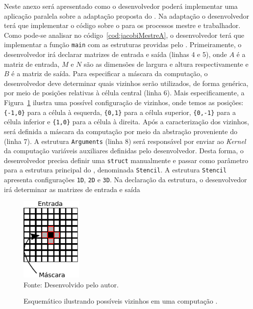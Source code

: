 Neste anexo será apresentado como o desenvolvedor poderá implementar uma
aplicação paralela sobre a adaptação proposta do \fw \pskel. Na adaptação o desenvolvedor
terá que implementar o código sobre o \fw \pskel para os processos mestre e
trabalhador. Como pode-se analisar no código~\ref{cod:jacobiMestreA}, o
desenvolvedor terá que implementar a função \texttt{main} com as estruturas
providas pelo \fw. Primeiramente, o desenvolvedor irá declarar matrizes de
entrada e saída (linhas 4 e 5), onde $A$ é
a matriz de entrada, $M$ e $N$ são as dimensões de largura e altura
respectivamente e $B$ é a matriz de saída. Para especificar a máscara da computação, o desenvolvedor deve determinar quais
vizinhos serão utilizados, de forma genérica, por meio de posições relativas à
célula central (linha 6). Mais especificamente, a Figura~\ref{fig:stencilA} ilustra uma
possível configuração de vizinhos, onde temos as posições: \texttt{\{-1,0\}}
para a célula à esquerda, \texttt{\{0,1\}} para a célula superior,
\texttt{\{0,-1\}} para a célula inferior e \texttt{\{1,0\}} para a célula à
direita. Após a caracterização dos vizinhos, será definida a máscara da
computação por meio da abstração proveniente do \fw (linha 7). A estrutura
\texttt{Arguments} (linha 8) será responsável por enviar ao \textit{Kernel} da
computação variáveis auxiliares definidas pelo desenvolvedor. Desta forma, o
desenvolvedor precisa definir uma \texttt{struct} manualmente e passar como
parâmetro para a estrutura
principal do \fw, denominada \texttt{Stencil}. A estrutura \texttt{Stencil}
apresenta configurações \texttt{1D}, \texttt{2D} e \texttt{3D}. Na declaração da
estrutura, o desenvolvedor irá determinar as matrizes de entrada e saída

\begin{figure}[!h]
    \centering
    \caption{Esquemático ilustrando possíveis vizinhos em uma computação \stencil.}
    \includegraphics[width=3cm]{figs/vizinhosAnexo.pdf} \\
    Fonte: Desenvolvido pelo autor.
    \label{fig:stencilA}
\end{figure}

